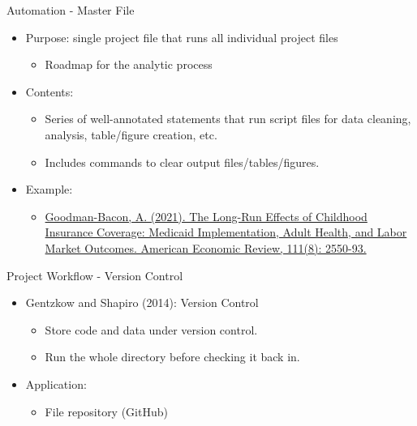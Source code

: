 \documentclass{beamer}
\begin{document}
\begin{frame}{Automation - Master File}
    \begin{itemize}
        \item Purpose: single project file that runs all individual project files
            \begin{itemize}
                \item Roadmap for the analytic process
            \end{itemize}
        \item Contents:
            \begin{itemize}
                \item Series of well-annotated statements that run script files for data cleaning, analysis, table/figure creation, etc.
                \item Includes commands to clear output files/tables/figures.
            \end{itemize}
        \item Example:
            \begin{itemize}
                \item \color{blue} \href{https://github.com/k-callison/hpam7660-sp24/blob/main/resources/agb_masterfile.pdf}{Goodman-Bacon, A. (2021). The Long-Run Effects of Childhood Insurance Coverage: Medicaid Implementation, Adult Health, and Labor Market Outcomes. American Economic Review, 111(8): 2550-93.}
            \end{itemize}
    \end{itemize}
\end{frame}

\begin{frame}{Project Workflow - Version Control}
    \begin{itemize}
        \item Gentzkow and Shapiro (2014): Version Control
            \begin{itemize}
                \item Store code and data under version control.
                \item Run the whole directory before checking it back in.
            \end{itemize}
        \item Application:
            \begin{itemize}
                \item File repository (GitHub)
            \end{itemize}
    \end{itemize}
\end{frame}
\end{document}
